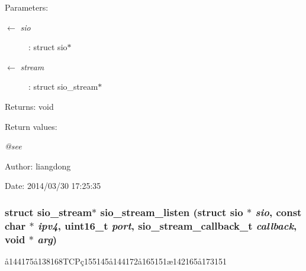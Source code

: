 \begin{Desc}
\item[Parameters:]
\begin{description}
\item[\mbox{$\leftarrow$} {\em sio}]: struct sio$\ast$ \item[\mbox{$\leftarrow$} {\em stream}]: struct sio\_\-stream$\ast$ \end{description}
\end{Desc}
\begin{Desc}
\item[Returns:]void \end{Desc}
\begin{Desc}
\item[Return values:]
\begin{description}
\item[{\em @see}]\end{description}
\end{Desc}
\begin{Desc}
\item[Author:]liangdong \end{Desc}
\begin{Desc}
\item[Date:]2014/03/30 17:25:35 \end{Desc}
\subsubsection{\setlength{\rightskip}{0pt plus 5cm}struct sio\_\-stream$\ast$ sio\_\-stream\_\-listen (struct sio $\ast$ {\em sio}, const char $\ast$ {\em ipv4}, uint16\_\-t {\em port}, sio\_\-stream\_\-callback\_\-t {\em callback}, void $\ast$ {\em arg})}\label{sio__stream_8c_a7}


\aa{}144175\aa{}138168TCP\c{c}155145\aa{}144172\aa{}165151\ae{}142165\aa{}173151 

